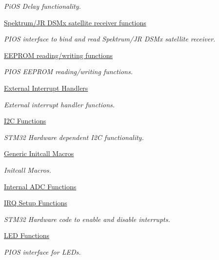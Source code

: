 \begin{DoxyCompactItemize}
\begin{DoxyCompactList}\small\item\em \-Pi\-O\-S \-Delay functionality. \end{DoxyCompactList}\item 
\hyperlink{group___p_i_o_s___d_s_m}{\-Spektrum/\-J\-R D\-S\-Mx satellite receiver functions}
\begin{DoxyCompactList}\small\item\em \-P\-I\-O\-S interface to bind and read \-Spektrum/\-J\-R \-D\-S\-Mx satellite receiver. \end{DoxyCompactList}\item 
\hyperlink{group___p_i_o_s___e_e_p_r_o_m}{\-E\-E\-P\-R\-O\-M reading/writing functions}
\begin{DoxyCompactList}\small\item\em \-P\-I\-O\-S \-E\-E\-P\-R\-O\-M reading/writing functions. \end{DoxyCompactList}\item 
\hyperlink{group___p_i_o_s___e_x_t_i}{\-External Interrupt Handlers}
\begin{DoxyCompactList}\small\item\em \-External interrupt handler functions. \end{DoxyCompactList}\item 
\hyperlink{group___p_i_o_s___i2_c}{\-I2\-C Functions}
\begin{DoxyCompactList}\small\item\em \-S\-T\-M32 \-Hardware dependent \-I2\-C functionality. \end{DoxyCompactList}\item 
\hyperlink{group___p_i_o_s___i_n_i_t_c_a_l_l}{\-Generic Initcall Macros}
\begin{DoxyCompactList}\small\item\em \-Initcall \-Macros. \end{DoxyCompactList}\item 
\hyperlink{group___p_i_o_s___i_n_t_e_r_n_a_l___a_d_c}{\-Internal A\-D\-C Functions}
\item 
\hyperlink{group___p_i_o_s___i_r_q}{\-I\-R\-Q Setup Functions}
\begin{DoxyCompactList}\small\item\em \-S\-T\-M32 \-Hardware code to enable and disable interrupts. \end{DoxyCompactList}\item 
\hyperlink{group___p_i_o_s___l_e_d}{\-L\-E\-D Functions}
\begin{DoxyCompactList}\small\item\em \-P\-I\-O\-S interface for \-L\-E\-Ds. \end{DoxyCompactList}\item 

\end{DoxyCompactItemize}

